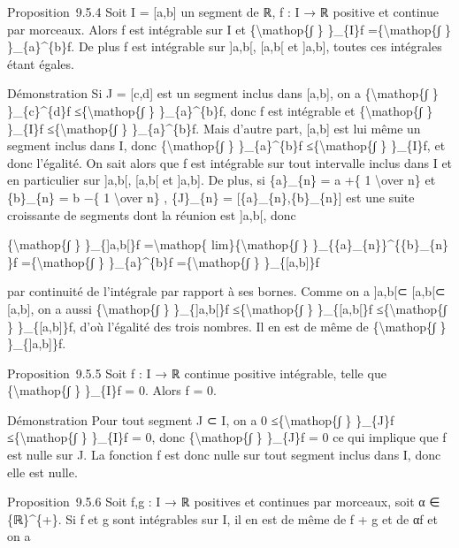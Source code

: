\documentclass[]{article}
\begin{document}
Proposition~9.5.4 Soit I = {[}a,b{]} un segment de ℝ, f : I → ℝ positive
et continue par morceaux. Alors f est intégrable sur I et
\{\textbackslash{}mathop\{∫ \} \}\_\{I\}f =\{\textbackslash{}mathop\{∫
\} \}\_\{a\}\^{}\{b\}f. De plus f est intégrable sur {]}a,b{[},
{[}a,b{[} et {]}a,b{]}, toutes ces intégrales étant égales.

Démonstration Si J = {[}c,d{]} est un segment inclus dans {[}a,b{]}, on
a \{\textbackslash{}mathop\{∫ \} \}\_\{c\}\^{}\{d\}f
≤\{\textbackslash{}mathop\{∫ \} \}\_\{a\}\^{}\{b\}f, donc f est
intégrable et \{\textbackslash{}mathop\{∫ \} \}\_\{I\}f
≤\{\textbackslash{}mathop\{∫ \} \}\_\{a\}\^{}\{b\}f. Mais d'autre part,
{[}a,b{]} est lui même un segment inclus dans I, donc
\{\textbackslash{}mathop\{∫ \} \}\_\{a\}\^{}\{b\}f
≤\{\textbackslash{}mathop\{∫ \} \}\_\{I\}f, et donc l'égalité. On sait
alors que f est intégrable sur tout intervalle inclus dans I et en
particulier sur {]}a,b{[}, {[}a,b{[} et {]}a,b{]}. De plus, si
\{a\}\_\{n\} = a +\{ 1 \textbackslash{}over n\} et \{b\}\_\{n\} = b −\{
1 \textbackslash{}over n\} , \{J\}\_\{n\} =
{[}\{a\}\_\{n\},\{b\}\_\{n\}{]} est une suite croissante de segments
dont la réunion est {]}a,b{[}, donc

\{\textbackslash{}mathop\{∫ \} \}\_\{{]}a,b{[}\}f
=\textbackslash{}mathop\{ lim\}\{\textbackslash{}mathop\{∫ \}
\}\_\{\{a\}\_\{n\}\}\^{}\{\{b\}\_\{n\} \}f =\{\textbackslash{}mathop\{∫
\} \}\_\{a\}\^{}\{b\}f =\{\textbackslash{}mathop\{∫ \}
\}\_\{{[}a,b{]}\}f

par continuité de l'intégrale par rapport à ses bornes. Comme on a
{]}a,b{[}⊂ {[}a,b{[}⊂ {[}a,b{]}, on a aussi \{\textbackslash{}mathop\{∫
\} \}\_\{{]}a,b{[}\}f ≤\{\textbackslash{}mathop\{∫ \} \}\_\{{[}a,b{[}\}f
≤\{\textbackslash{}mathop\{∫ \} \}\_\{{[}a,b{]}\}f, d'où l'égalité des
trois nombres. Il en est de même de \{\textbackslash{}mathop\{∫ \}
\}\_\{{]}a,b{]}\}f.

Proposition~9.5.5 Soit f : I → ℝ continue positive intégrable, telle que
\{\textbackslash{}mathop\{∫ \} \}\_\{I\}f = 0. Alors f = 0.

Démonstration Pour tout segment J ⊂ I, on a 0
≤\{\textbackslash{}mathop\{∫ \} \}\_\{J\}f ≤\{\textbackslash{}mathop\{∫
\} \}\_\{I\}f = 0, donc \{\textbackslash{}mathop\{∫ \} \}\_\{J\}f = 0 ce
qui implique que f est nulle sur J. La fonction f est donc nulle sur
tout segment inclus dans I, donc elle est nulle.

Proposition~9.5.6 Soit f,g : I → ℝ positives et continues par morceaux,
soit α ∈ \{ℝ\}\^{}\{+\}. Si f et g sont intégrables sur I, il en est de
même de f + g et de αf et on a
\end{document}
